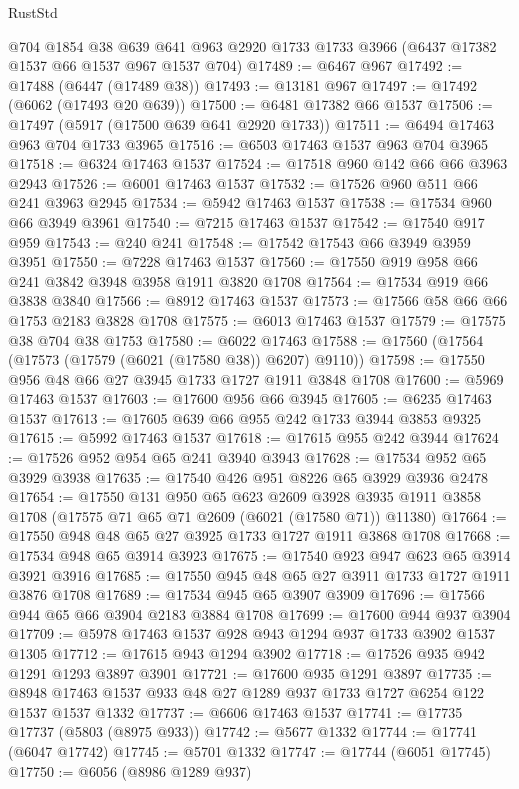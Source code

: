 \begin{lexlean}{RustStd}
\begin{coremodule}
    @704
    @1854
    @38
    @639
    @641
    @963
    @2920
    @1733
    @1733
    @3966
    (@6437 @17382 @1537 @66 @1537 @967 @1537 @704)
@17489 := @6467 @967
@17492 := @17488 (@6447 (@17489 @38))
@17493 := @13181 @967
@17497 := @17492 (@6062 (@17493 @20 @639))
@17500 := @6481 @17382 @66 @1537
@17506 := @17497 (@5917 (@17500 @639 @641 @2920 @1733))
@17511 := @6494 @17463 @963 @704 @1733 @3965
@17516 := @6503 @17463 @1537 @963 @704 @3965
@17518 := @6324 @17463 @1537
@17524 := @17518 @960 @142 @66 @66 @3963 @2943
@17526 := @6001 @17463 @1537
@17532 := @17526 @960 @511 @66 @241 @3963 @2945
@17534 := @5942 @17463 @1537
@17538 := @17534 @960 @66 @3949 @3961
@17540 := @7215 @17463 @1537
@17542 := @17540 @917 @959
@17543 := @240 @241
@17548 := @17542 @17543 @66 @3949 @3959 @3951
@17550 := @7228 @17463 @1537
@17560 := @17550 @919 @958 @66 @241 @3842 @3948 @3958 @1911 @3820 @1708
@17564 := @17534 @919 @66 @3838 @3840
@17566 := @8912 @17463 @1537
@17573 := @17566 @58 @66 @66 @1753 @2183 @3828 @1708
@17575 := @6013 @17463 @1537
@17579 := @17575 @38 @704 @38 @1753
@17580 := @6022 @17463
@17588 := @17560 (@17564 (@17573 (@17579 (@6021 (@17580 @38)) @6207) @9110))
@17598 := @17550 @956 @48 @66 @27 @3945 @1733 @1727 @1911 @3848 @1708
@17600 := @5969 @17463 @1537
@17603 := @17600 @956 @66 @3945
@17605 := @6235 @17463 @1537
@17613 := @17605 @639 @66 @955 @242 @1733 @3944 @3853 @9325
@17615 := @5992 @17463 @1537
@17618 := @17615 @955 @242 @3944
@17624 := @17526 @952 @954 @65 @241 @3940 @3943
@17628 := @17534 @952 @65 @3929 @3938
@17635 := @17540 @426 @951 @8226 @65 @3929 @3936 @2478
@17654 := @17550
    @131
    @950
    @65
    @623
    @2609
    @3928
    @3935
    @1911
    @3858
    @1708
    (@17575 @71 @65 @71 @2609 (@6021 (@17580 @71)) @11380)
@17664 := @17550 @948 @48 @65 @27 @3925 @1733 @1727 @1911 @3868 @1708
@17668 := @17534 @948 @65 @3914 @3923
@17675 := @17540 @923 @947 @623 @65 @3914 @3921 @3916
@17685 := @17550 @945 @48 @65 @27 @3911 @1733 @1727 @1911 @3876 @1708
@17689 := @17534 @945 @65 @3907 @3909
@17696 := @17566 @944 @65 @66 @3904 @2183 @3884 @1708
@17699 := @17600 @944 @937 @3904
@17709 := @5978 @17463 @1537 @928 @943 @1294 @937 @1733 @3902 @1537 @1305
@17712 := @17615 @943 @1294 @3902
@17718 := @17526 @935 @942 @1291 @1293 @3897 @3901
@17721 := @17600 @935 @1291 @3897
@17735 := @8948 @17463 @1537 @933 @48 @27 @1289 @937 @1733 @1727 @6254 @122 @1537 @1537 @1332
@17737 := @6606 @17463 @1537
@17741 := @17735 @17737 (@5803 (@8975 @933))
@17742 := @5677 @1332
@17744 := @17741 (@6047 @17742)
@17745 := @5701 @1332
@17747 := @17744 (@6051 @17745)
@17750 := @6056 (@8986 @1289 @937)

\end{coremodule}
\end{lexlean}
